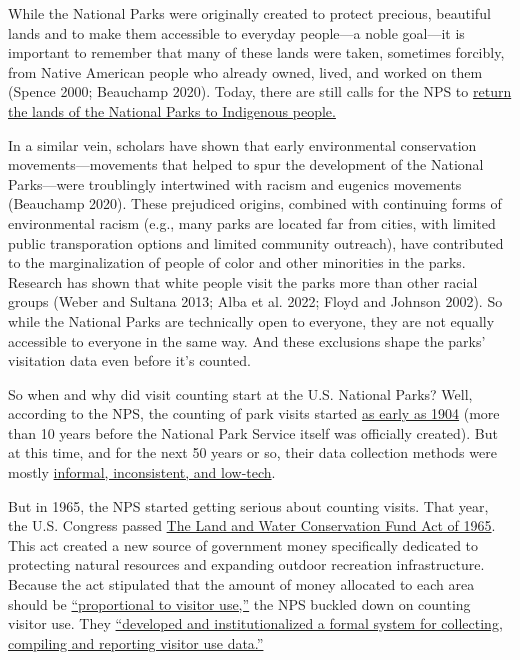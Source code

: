 \documentclass[
  letterpaper,
  DIV=11,
  numbers=noendperiod]{scrartcl}
\begin{document}
While the National Parks were originally created to protect precious,
beautiful lands and to make them accessible to everyday people---a noble
goal---it is important to remember that many of these lands were taken,
sometimes forcibly, from Native American people who already owned,
lived, and worked on them (Spence 2000; Beauchamp 2020). Today, there
are still calls for the NPS to
\href{https://www.theatlantic.com/magazine/archive/2021/05/return-the-national-parks-to-the-tribes/618395/}{return
the lands of the National Parks to Indigenous people.}

In a similar vein, scholars have shown that early environmental
conservation movements---movements that helped to spur the development
of the National Parks---were troublingly intertwined with racism and
eugenics movements (Beauchamp 2020). These prejudiced origins, combined
with continuing forms of environmental racism (e.g., many parks are
located far from cities, with limited public transporation options and
limited community outreach), have contributed to the marginalization of
people of color and other minorities in the parks. Research has shown
that white people visit the parks more than other racial groups (Weber
and Sultana 2013; Alba et al. 2022; Floyd and Johnson 2002). So while
the National Parks are technically open to everyone, they are not
equally accessible to everyone in the same way. And these exclusions
shape the parks' visitation data even before it's counted.

So when and why did visit counting start at the U.S. National Parks?
Well, according to the NPS, the counting of park visits started
\href{https://www.nps.gov/subjects/socialscience/visitor-use-statistics.htm}{as
early as 1904} (more than 10 years before the National Park Service
itself was officially created). But at this time, and for the next 50
years or so, their data collection methods were mostly
\href{https://www.nps.gov/subjects/socialscience/visitor-use-statistics.htm}{informal,
inconsistent, and low-tech}.

But in 1965, the NPS started getting serious about counting visits. That
year, the U.S. Congress passed
\href{https://www.everycrsreport.com/reports/RL33531.html}{The Land and
Water Conservation Fund Act of 1965}. This act created a new source of
government money specifically dedicated to protecting natural resources
and expanding outdoor recreation infrastructure. Because the act
stipulated that the amount of money allocated to each area should be
\href{https://www.nps.gov/subjects/socialscience/statistics-history.htm}{``proportional
to visitor use,''} the NPS buckled down on counting visitor use. They
\href{https://www.nps.gov/subjects/socialscience/statistics-history.htm}{``developed
and institutionalized a formal system for collecting, compiling and
reporting visitor use data.''}
\end{document}
